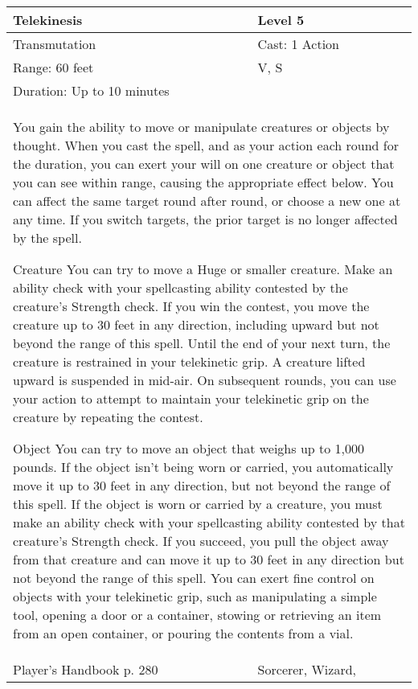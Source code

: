 \documentclass[11pt]{report}
\begin{document}
\begin{table}[H]
	\begin{tabular}{||p{6cm}|p{6cm}||}
		\hline\hline
		\bf{Telekinesis} & Level 5\\ \hline
		Transmutation & Cast: 1 Action\\ \hline
		Range: 60 feet & V, S\\ \hline
		Duration: Up to 10 minutes & \\ \hline
		\multicolumn{2}{||p{12cm}||}{You gain the ability to move or manipulate creatures or objects by thought.
When you cast the spell, and as your action each round for the duration, you can exert your will on one creature or object that you can see within range, causing the appropriate effect below. You can affect the same target round after round, or choose a new one at any time. If you switch targets, the prior target is no longer affected by the spell.

Creature
You can try to move a Huge or smaller creature. Make an ability check with your spellcasting ability contested by the creature’s Strength check. If you win the contest, you move the creature up to 30 feet in any direction, including upward but not beyond the range of this spell. Until the end of your next turn, the creature is restrained in your telekinetic grip. A creature lifted upward is suspended in mid-air.
On subsequent rounds, you can use your action to attempt to maintain your telekinetic grip on the creature by repeating the contest.

Object
You can try to move an object that weighs up to 1,000 pounds. If the object isn’t being worn or carried, you automatically move it up to 30 feet in any direction, but not beyond the range of this spell.
If the object is worn or carried by a creature, you must make an ability check with your spellcasting ability contested by that creature’s Strength check. If you succeed, you pull the object away from that creature and can move it up to 30 feet in any direction but not beyond the range of this spell.
You can exert fine control on objects with your telekinetic grip, such as manipulating a simple tool, opening a door or a container, stowing or retrieving an item from an open container, or pouring the contents from a vial.}\\ \hline
Player's Handbook p. 280 & Sorcerer, Wizard, \\ \hline\hline
	\end{tabular}
\end{table}
\end{document}

